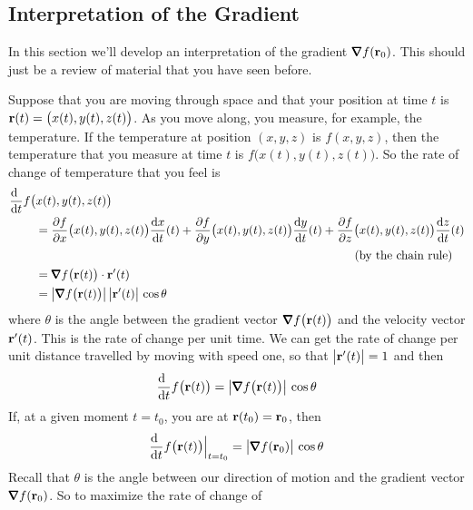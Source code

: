 \subsection{Interpretation of the Gradient}\label{sec:gradInterp}
In this section we'll develop an interpretation of the gradient
$\vnabla f(\vr_0)$. This should just be a review of material that 
you have seen before.

Suppose that you are moving through space and that your position at time $t$
is $\mathbf{r}(t)=\big(x(t),y(t),z(t)\big)$. As you move along, you measure, 
for example, the temperature. If the temperature at position $(x,y,z)$ 
is $f(x,y,z)$, then the temperature that you measure at time $t$ is $f\big(x(t),y(t),z(t)\big)$. So the rate of change of temperature that you feel is
\begin{align*}
&\diff{\hfill}{t}f\big(x(t),y(t),z(t)\big)\\
&\hskip0.3in
  =\frac{\partial f}{\partial x}\big(x(t),y(t),z(t)\big) \diff{x}{t}(t)
  +\frac{\partial f}{\partial y}\big(x(t),y(t),z(t)\big) \diff{y}{t}(t)
  +\frac{\partial f}{\partial z}\big(x(t),y(t),z(t)\big) \diff{z}{t}(t)
\\&\hskip4in \text{(by the chain rule)}
\\
&\hskip0.3in=\vnabla f\big(\vr(t)\big)\cdot\vr'(t) \\
&\hskip0.3in=\big|\vnabla f\big(\vr(t)\big)\big|
                \,\big|\vr'(t)\big|\,\cos\theta 
\end{align*}
where $\theta$ is the angle between the gradient 
vector $\vnabla f\big(\vr(t)\big)$ and the velocity vector $\mathbf{r}'(t)$.
This is the rate of change per unit time. We can get the rate of change
per unit distance travelled by moving with speed one, so that 
$\big|\mathbf{r}'(t)\big|=1$ and then
\begin{align*}
\diff{\hfill}{t}f\big(\vr(t)\big)
         =\big|\vnabla f\big(\vr(t)\big)\big|\,\cos\theta 
\end{align*}
If, at a given moment $t=t_0$, you are at $\mathbf{r}(t_0)=\mathbf{r}_0$, then
\begin{align*}
\diff{\hfill}{t}f\big(\vr(t)\big)\Big|_{t=t_0}
         =\big|\vnabla f(\vr_0)\big|\,\cos\theta 
\end{align*}
Recall that $\theta$ is the angle between our  direction of motion and
the gradient vector $\vnabla f(\vr_0)$. So to maximize the rate of change of
